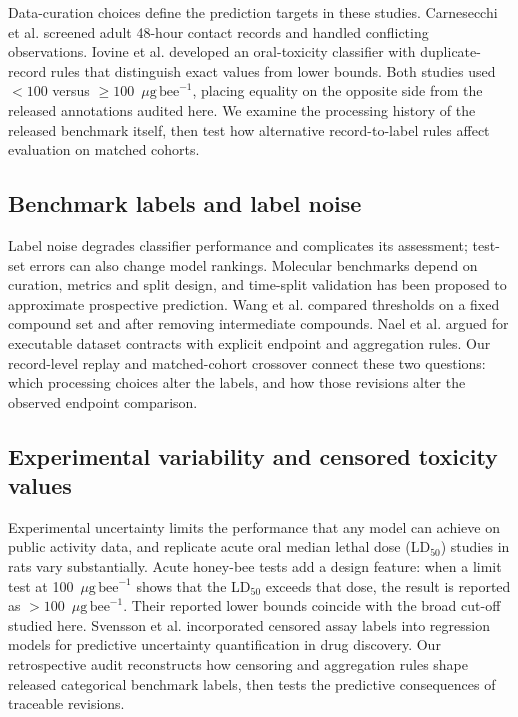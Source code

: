 \documentclass{ieeeaccess}
\newcommand{\ugbee}{\ensuremath{\mu\mathrm{g\,bee}^{-1}}\xspace}
\begin{document}
Data-curation choices define the prediction targets in these studies. Carnesecchi et al.\cite{Carnesecchi2020} screened adult 48-hour contact records and handled conflicting observations. Iovine et al.\cite{Iovine2026} developed an oral-toxicity classifier with duplicate-record rules that distinguish exact values from lower bounds. Both studies used \(<100\) versus \(\geq100\)~\ugbee, placing equality on the opposite side from the released annotations audited here. We examine the processing history of the released benchmark itself, then test how alternative record-to-label rules affect evaluation on matched cohorts.

\subsection{Benchmark labels and label noise}
Label noise degrades classifier performance and complicates its assessment\cite{Frenay2014}; test-set errors can also change model rankings\cite{Northcutt2021}. Molecular benchmarks depend on curation, metrics and split design\cite{Wu2018}, and time-split validation has been proposed to approximate prospective prediction\cite{Sheridan2013}. Wang et al.\cite{Wang2023} compared thresholds on a fixed compound set and after removing intermediate compounds. Nael et al.\cite{Nael2026} argued for executable dataset contracts with explicit endpoint and aggregation rules. Our record-level replay and matched-cohort crossover connect these two questions: which processing choices alter the labels, and how those revisions alter the observed endpoint comparison.

\subsection{Experimental variability and censored toxicity values}
Experimental uncertainty limits the performance that any model can achieve on public activity data\cite{Brown2009,Kramer2012}, and replicate acute oral median lethal dose (LD\(_{50}\)) studies in rats vary substantially\cite{Karmaus2022}. Acute honey-bee tests add a design feature: when a limit test at 100~\ugbee shows that the LD\(_{50}\) exceeds that dose, the result is reported as \(>100\)~\ugbee\cite{OECD213,OECD214}. Their reported lower bounds coincide with the broad cut-off studied here. Svensson et al.\cite{Svensson2025} incorporated censored assay labels into regression models for predictive uncertainty quantification in drug discovery. Our retrospective audit reconstructs how censoring and aggregation rules shape released categorical benchmark labels, then tests the predictive consequences of traceable revisions.
\end{document}
